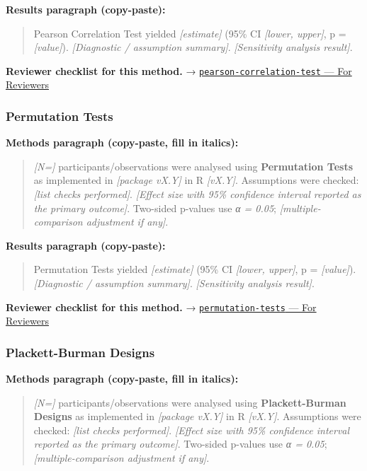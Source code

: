 \documentclass[
]{article}
\begin{document}
\textbf{Results paragraph (copy-paste):}

\begin{quote}
Pearson Correlation Test yielded \emph{{[}estimate{]}} (95\% CI
\emph{{[}lower, upper{]}}, p = \emph{{[}value{]}}). \emph{{[}Diagnostic
/ assumption summary{]}}. \emph{{[}Sensitivity analysis result{]}}.
\end{quote}

\textbf{Reviewer checklist for this method.} →
\href{../chapters/04-inferential/pearson-correlation-test.Rmd\#for-reviewers}{\texttt{pearson-correlation-test}
--- For Reviewers}

\subsubsection{Permutation Tests}\label{permutation-tests}

\textbf{Methods paragraph (copy-paste, fill in italics):}

\begin{quote}
\emph{{[}N={]}} participants/observations were analysed using
\textbf{Permutation Tests} as implemented in \emph{{[}package vX.Y{]}}
in R \emph{{[}vX.Y{]}}. Assumptions were checked: \emph{{[}list checks
performed{]}}. \emph{{[}Effect size with 95\% confidence interval
reported as the primary outcome{]}}. Two-sided p-values use \emph{α =
0.05}; \emph{{[}multiple-comparison adjustment if any{]}}.
\end{quote}

\textbf{Results paragraph (copy-paste):}

\begin{quote}
Permutation Tests yielded \emph{{[}estimate{]}} (95\% CI \emph{{[}lower,
upper{]}}, p = \emph{{[}value{]}}). \emph{{[}Diagnostic / assumption
summary{]}}. \emph{{[}Sensitivity analysis result{]}}.
\end{quote}

\textbf{Reviewer checklist for this method.} →
\href{../chapters/04-inferential/permutation-tests.Rmd\#for-reviewers}{\texttt{permutation-tests}
--- For Reviewers}

\subsubsection{Plackett-Burman Designs}\label{plackett-burman-designs}

\textbf{Methods paragraph (copy-paste, fill in italics):}

\begin{quote}
\emph{{[}N={]}} participants/observations were analysed using
\textbf{Plackett-Burman Designs} as implemented in \emph{{[}package
vX.Y{]}} in R \emph{{[}vX.Y{]}}. Assumptions were checked: \emph{{[}list
checks performed{]}}. \emph{{[}Effect size with 95\% confidence interval
reported as the primary outcome{]}}. Two-sided p-values use \emph{α =
0.05}; \emph{{[}multiple-comparison adjustment if any{]}}.
\end{quote}
\end{document}
